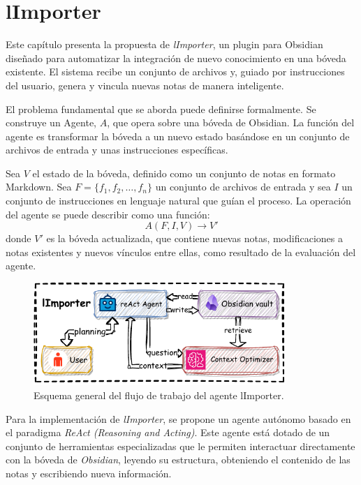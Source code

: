 \chapter{lImporter}\label{chapter:proposal}
Este capítulo presenta la propuesta de \textit{lImporter}, un plugin para Obsidian diseñado para automatizar la integración de nuevo conocimiento en una bóveda existente. El sistema recibe un conjunto de archivos y, guiado por instrucciones del usuario, genera y vincula nuevas notas de manera inteligente.

El problema fundamental que se aborda puede definirse formalmente. Se construye un Agente, $A$, que opera sobre una bóveda de Obsidian. La función del agente es transformar la bóveda a un nuevo estado basándose en un conjunto de archivos de entrada y unas instrucciones específicas.

Sea $V$ el estado de la bóveda, definido como un conjunto de notas en formato Markdown. Sea $F = \{f_1, f_2, \dots, f_n\}$ un conjunto de archivos de entrada y sea $I$ un conjunto de instrucciones en lenguaje natural que guían el proceso. La operación del agente se puede describir como una función:
\[ A(F, I, V) \rightarrow V' \]
donde $V'$ es la bóveda actualizada, que contiene nuevas notas, modificaciones a notas existentes y nuevos vínculos entre ellas, como resultado de la evaluación del agente.

\begin{figure}[h]
    \centering
    \includegraphics[width=0.85\textwidth]{figures/limporter.pdf}
    \caption{Esquema general del flujo de trabajo del agente lImporter.}
    \label{fig:importer_schema}
\end{figure}

Para la implementación de \textit{lImporter}, se propone un agente autónomo basado en el paradigma \textit{ReAct (Reasoning and Acting)}. Este agente está dotado de un conjunto de herramientas especializadas que le permiten interactuar directamente con la bóveda de \textit{Obsidian}, leyendo su estructura, obteniendo el contenido de las notas y escribiendo nueva información.

